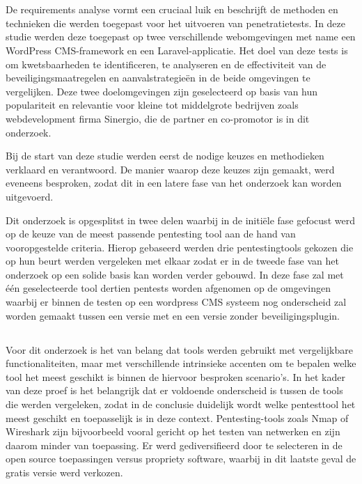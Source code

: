 \section{}
De requirements analyse vormt een cruciaal luik en beschrijft de methoden en technieken die werden toegepast 
voor het uitvoeren van penetratietests. In deze studie werden deze toegepast op twee 
verschillende webomgevingen met name een WordPress CMS-framework en een Laravel-applicatie. Het doel van deze tests is om kwetsbaarheden te identificeren, te 
analyseren en de effectiviteit van de beveiligingsmaatregelen en aanvalstrategieën in de beide omgevingen te vergelijken.
Deze twee doelomgevingen zijn geselecteerd op basis van hun populariteit en relevantie voor kleine tot middelgrote bedrijven 
zoals webdevelopment firma Sinergio, die de partner en co-promotor is in dit onderzoek.

Bij de start van deze studie werden eerst de nodige keuzes en methodieken verklaard en verantwoord. De manier waarop deze keuzes zijn gemaakt, werd eveneens 
besproken, zodat dit in een latere fase van het onderzoek kan worden uitgevoerd.

Dit onderzoek is opgesplitst in twee delen waarbij in de initiële fase gefocust werd op de keuze van de meest passende pentesting tool 
aan de hand van vooropgestelde criteria. Hierop gebaseerd werden drie pentestingtools gekozen die op hun beurt werden vergeleken met elkaar 
zodat er in de tweede fase van het onderzoek op een solide basis kan worden verder gebouwd. In deze fase zal met één geselecteerde 
tool dertien pentests worden afgenomen op de omgevingen waarbij er binnen de testen op een wordpress CMS systeem nog onderscheid zal worden gemaakt 
tussen een versie met en een versie zonder beveiligingsplugin.

\subsection{}
Voor dit onderzoek is het van 
belang dat tools werden gebruikt met vergelijkbare functionaliteiten, maar met verschillende intrinsieke accenten om te bepalen welke 
tool het meest geschikt is binnen de hiervoor besproken scenario's. In het kader van deze proef is het belangrijk dat er voldoende onderscheid is tussen de tools 
die werden vergeleken, zodat in de conclusie duidelijk wordt welke pentesttool het meest geschikt en toepasselijk is in deze context. 
Pentesting-tools zoals Nmap of Wireshark zijn bijvoorbeeld vooral gericht op het testen van netwerken en  zijn daarom minder van toepassing. Er werd 
gediversifieerd door te selecteren in de open source toepassingen versus propriety software, waarbij in dit laatste geval de gratis versie werd 
verkozen. 

